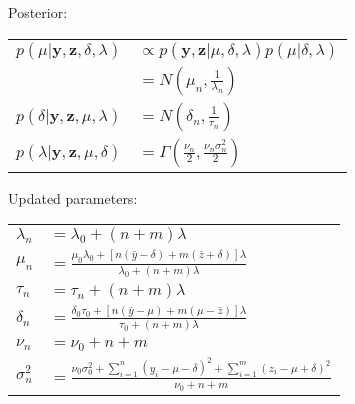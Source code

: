      Posterior:\\
     \begin{tabulary}{\linewidth}{l L}
         $p(\mu|\mathbf{y, z}, \delta, \lambda)$
         & $\propto p(\mathbf{y, z}|\mu, \delta, \lambda)
         p(\mu|\delta, \lambda)$\\
         & $= N(\mu_n, \frac{1}{\lambda_n})$\\
         $p(\delta|\mathbf{y, z}, \mu, \lambda)$
         & $=N(\delta_n, \frac{1}{\tau_n})$\\
         $p(\lambda | \mathbf{y, z}, \mu, \delta)$
         & $=\Gamma(\frac{\nu_n}{2},
         \frac{\nu_n\sigma_n^2}{2})$
     \end{tabulary}

     Updated parameters:\\
     \begin{tabulary}{\linewidth}{l L}
         $\lambda_n$
         & $=\lambda_0 + (n+m)\lambda$\\
         $\mu_n$
         &
         $=\frac{\mu_0\lambda_0+[n(\bar{y}-\delta)+m(\bar{z}+\delta)]\lambda}
         {\lambda_0 + (n+m)\lambda}$\\
         $\tau_n$
         & $= \tau_n + (n+m)\lambda$\\
         $\delta_n$
         & $=\frac{\delta_0 \tau_0 +
         [n(\bar{y}-\mu)+m(\mu-\bar{z})]\lambda}{\tau_0 + (n+m)\lambda}$\\
         $\nu_n$
         & $=\nu_0 + n + m$\\
         $\sigma_n^2$
         & $=\frac{\nu_0\sigma_0^2 + \sum_{i=1}^n (y_i -
         \mu-\delta)^2 + \sum_{i=1}^m (z_i - \mu + \delta)^2}
         {\nu_0 + n + m}$
     \end{tabulary}

